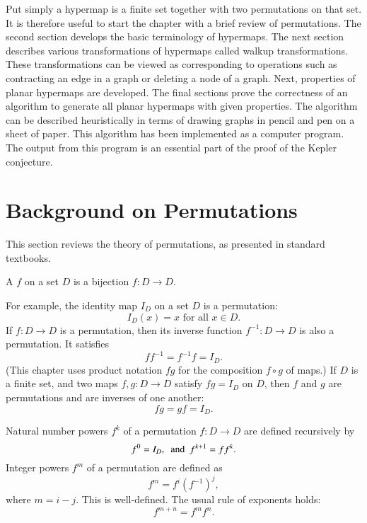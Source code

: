 \begin{summary}
Put simply a hypermap  is a finite set together
with two permutations on that set.  It is therefore useful to start
the chapter with a brief review of permutations.  The second section
develops the basic terminology of hypermaps.  The next section
describes various transformations of hypermaps called walkup
transformations.  These transformations can be viewed as corresponding
to  operations such as contracting an edge in a graph or deleting
a node of a graph.  Next, properties of planar hypermaps are
developed.  The final sections prove the correctness of an algorithm
to generate all planar hypermaps with given properties.  The algorithm
can be described heuristically in terms of drawing graphs in pencil
and pen on a sheet of paper.  This algorithm has been implemented as a
computer program.  The output from this program is an essential part
of the proof of the Kepler conjecture.
\end{summary}


\section{Background on Permutations}

This section reviews the theory of permutations, as presented in
standard textbooks.

\begin{definition}[permutation]
A  $f$ on a set
  $D$ is a bijection $f:D\to D$.
\end{definition}

For example, the identity map $I_D$ on a set $D$  is a permutation:
\[ 
I_D(x)=x \text{ for all } x \in D.
\] 
If $f:D\to D$ is a permutation, then  its inverse function $f^{-1}:D\to D$
is also a permutation.  
It satisfies
\[ 
f f^{-1} = f^{-1} f = I_D.
\] 
(This chapter uses product notation $f g$ for the composition $f\circ g$ of maps.)
If $D$ is a finite set, and two maps
$f,g:D\to D$ satisfy $f g = I_D$ on $D$, then $f$ and $g$ are permutations and are
inverses of one another:
\[ 
f g = g f = I_D.
\] 

Natural number powers  $f^k$ of a permutation $f:D\to D$ are defined
recursively by
\[ 
f^0 = I_D,\text{ \ and \ }  f^{k+1} = f f^k.
\] 
Integer powers $f^m$ of a permutation are defined as
\[f^m = f^i (f^{-1})^j,\] where $m = i -j$.  This is well-defined.
The usual rule of exponents holds:
\[ 
f^{m+n} = f^m f^n.
\] 

